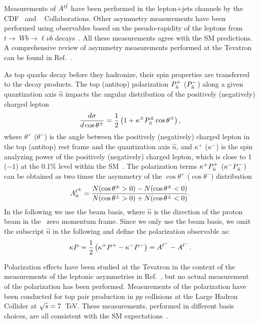 \documentclass[aps,prd,twocolumn,showpacs,superscriptaddress,groupedaddress,floatfix]{revtex4}
\begin{document}
Measurements of $\Att$ have been performed in the lepton+jets channels  by the CDF~\cite{Aaltonen:2012it} and \dzero~\cite{Abazov:2014cca} Collaborations.
Other 
asymmetry measurements have been performed using observables
based on the  pseudo-rapidity of the leptons from $t\to\ W b\to  \ell \nu b$ decays~\cite{Aaltonen:2013vaf,Aaltonen:2014eva,Abazov:2014oea,Abazov:2013wxa}.
All these measurements agree with the SM predictions.
A comprehensive review of asymmetry measurements performed at the Tevatron can be found in Ref.~\cite{Aguilar-Saavedra:2014kpa}.


As top quarks decay before they hadronize, their spin properties are transferred to the decay products.
The top (antitop) polarization
$\Polar{+}{\hat{n}}$
($\Polar{-}{\hat{n}}$) along a given quantization axis $\hat{n}$
impacts the angular distribution of the positively (negatively) charged lepton~\cite{Bernreuther:2008ju}
\begin{equation} \label{eq:single_lepton_polar}
\frac{\ddif \sigma}
{\ddif \cos\theta^{\pm}}=
\frac 1 2 \left( 
1+ \kappa^{\pm} \Polar{\pm}{\hat{n}}
\cos\theta^{\pm}
\right),
\end{equation}
where  $\theta^{+}$  ($\theta^{-}$) is  the angle between  the positively (negatively) charged lepton  in the top (antitop) rest frame and the quantization axis $\hat{n}$,
and $\kappa^{+}$ ($\kappa^{-}$) is the spin analyzing power of the positively (negatively) charged lepton, which is close to 1  ($-1$) at the 0.1\% level within the SM~\cite{Bernreuther:2008ju}. 
The polarization terms
$\kappa^{+}\Polar{+}{\hat{n}}$  ($\kappa^{-}\Polar{-}{\hat{n}}$) can be obtained as two times the asymmetry of the $\cos\theta^{+}$ ($\cos\theta^{-}$) distribution
\begin{equation}\defAP{\pm}{\hat{n}}.\end{equation}
In the following we use the  beam basis, where $\hat{n}$ is the direction of the proton beam in the \ttbar\ zero momentum frame.
Since we only use the beam basis,
we omit the subscript $\hat{n}$ in the following and
define the  polarization observable as:
\begin{equation}
\Ptt=\frac 1 2 \left( \kappa^{+}\Polar{+}{\invisible{\rm beam}} - \kappa^{-}\Polar{-}{\invisible{\rm beam}}\right)
=\AP{+}{\invisible{\rm beam}}-\AP{-}{\invisible{\rm beam}}.
\end{equation}


Polarization effects have been studied  at the Tevatron in the context of the measurements of the leptonic asymmetries in Ref.~\cite{Abazov:2012oxa},
but no actual measurement of the polarization has been performed.
Measurements of the polarization have been conducted for  top pair production in $pp$ collisions at the Large Hadron Collider
at $\sqrts=7$~TeV. These measurements, performed in different basis choices, are all consistent with the SM expectations~\cite{Chatrchyan:2013wua,Aad:2013ksa}.
\end{document}

